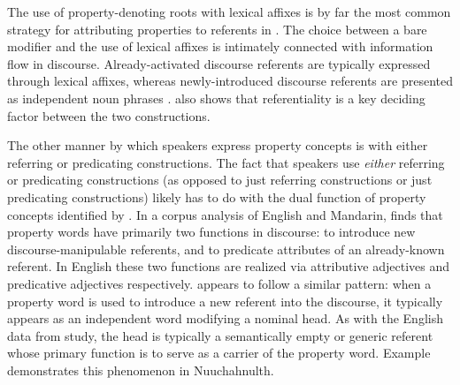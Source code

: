 \noindent The use of property-denoting roots with lexical affixes is by far the most common strategy for attributing properties to referents in . The choice between a bare modifier and the use of lexical affixes is intimately connected with information flow in discourse. Already-activated discourse referents are typically expressed through lexical affixes, whereas newly-introduced discourse referents are presented as independent noun phrases \parencite[887--889]{Mithun1984}. \textcite[144]{Nakayama2001} also shows that referentiality is a key deciding factor between the two constructions.

The other manner by which speakers express property concepts is with either referring or predicating constructions. The fact that speakers use \emph{either} referring or predicating constructions (as opposed to just referring constructions or just predicating constructions) likely has to do with the dual function of property concepts identified by \textcite{Thompson1989}. In a corpus analysis of English and Mandarin, \citeauthor{Thompson1989} finds that property words have primarily two functions in discourse: to introduce new discourse-manipulable referents, and to predicate attributes of an already-known referent. In English these two functions are realized via attributive adjectives and predicative adjectives respectively.  appears to follow a similar pattern: when a property word is used to introduce a new referent into the discourse, it typically appears as an independent word modifying a nominal head. As with the English data from  study, the head is typically a semantically empty or generic referent whose primary function is to serve as a carrier of the property word. Example  demonstrates this phenomenon in Nuuchahnulth.

